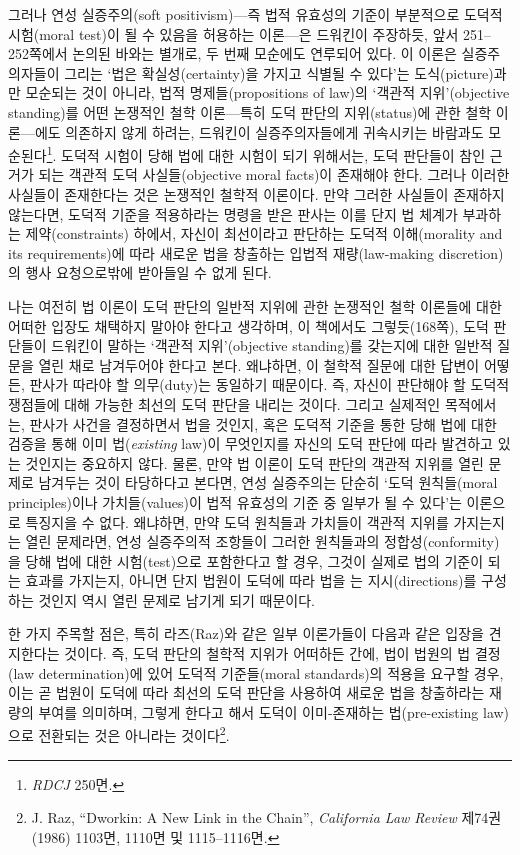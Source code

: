 그러나 연성 실증주의(soft positivism)---즉 법적 유효성의 기준이
부분적으로 도덕적 시험(moral test)이 될 수 있음을 허용하는 이론---은
드워킨이 주장하듯, 앞서 251--252쪽에서 논의된 바와는 별개로, 두 번째
모순에도 연루되어 있다. 이 이론은 실증주의자들이 그리는 `법은
확실성(certainty)을 가지고 식별될 수 있다'는 도식(picture)과만 모순되는
것이 아니라, 법적 명제들(propositions of law)의 `객관적 지위'(objective
standing)를 어떤 논쟁적인 철학 이론---특히 도덕 판단의 지위(status)에
관한 철학 이론---에도 의존하지 않게 하려는, 드워킨이 실증주의자들에게
귀속시키는 바람과도 모순된다\footnote{\emph{RDCJ} 250면.}. 도덕적 시험이
당해 법에 대한 시험이 되기 위해서는, 도덕 판단들이 참인 근거가 되는
객관적 도덕 사실들(objective moral facts)이 존재해야 한다. 그러나 이러한
사실들이 존재한다는 것은 논쟁적인 철학적 이론이다. 만약 그러한 사실들이
존재하지 않는다면, 도덕적 기준을 적용하라는 명령을 받은 판사는 이를 단지
법 체계가 부과하는 제약(constraints) 하에서, 자신이 최선이라고 판단하는
도덕적 이해(morality and its requirements)에 따라 새로운 법을 창출하는
입법적 재량(law-making discretion)의 행사 요청으로밖에 받아들일 수 없게
된다.

나는 여전히 법 이론이 도덕 판단의 일반적 지위에 관한 논쟁적인 철학
이론들에 대한 어떠한 입장도 채택하지 말아야 한다고 생각하며, 이 책에서도
그렇듯(168쪽), 도덕 판단들이 드워킨이 말하는 `객관적 지위'(objective
standing)를 갖는지에 대한 일반적 질문을 열린 채로 남겨두어야 한다고
본다. 왜냐하면, 이 철학적 질문에 대한 답변이 어떻든, 판사가 따라야 할
의무(duty)는 동일하기 때문이다. 즉, 자신이 판단해야 할 도덕적 쟁점들에
대해 가능한 최선의 도덕 판단을 내리는 것이다. 그리고 실제적인
목적에서는, 판사가 사건을 결정하면서 법을 
것인지, 혹은 도덕적 기준을 통한 당해 법에 대한 검증을 통해 이미
 법(\emph{existing} law)이 무엇인지를 자신의 도덕 판단에
따라 발견하고 있는 것인지는 중요하지 않다. 물론, 만약 법 이론이 도덕
판단의 객관적 지위를 열린 문제로 남겨두는 것이 타당하다고 본다면, 연성
실증주의는 단순히 `도덕 원칙들(moral principles)이나 가치들(values)이
법적 유효성의 기준 중 일부가 될 수 있다'는 이론으로 특징지을 수 없다.
왜냐하면, 만약 도덕 원칙들과 가치들이 객관적 지위를 가지는지는 열린
문제라면, 연성 실증주의적 조항들이 그러한 원칙들과의
정합성(conformity)을 당해 법에 대한 시험(test)으로 포함한다고 할 경우,
그것이 실제로 법의 기준이 되는 효과를 가지는지, 아니면 단지 법원이
도덕에 따라 법을 는 지시(directions)를 구성하는
것인지 역시 열린 문제로 남기게 되기 때문이다.

한 가지 주목할 점은, 특히 라즈(Raz)와 같은 일부 이론가들이 다음과 같은
입장을 견지한다는 것이다. 즉, 도덕 판단의 철학적 지위가 어떠하든 간에,
법이 법원의 법 결정(law determination)에 있어 도덕적 기준들(moral
standards)의 적용을 요구할 경우, 이는 곧 법원이 도덕에 따라 최선의 도덕
판단을 사용하여 새로운 법을 창출하라는 재량의 부여를 의미하며, 그렇게
한다고 해서 도덕이 이미-존재하는 법(pre-existing law)으로 전환되는 것은
아니라는 것이다\footnote{J. Raz, ``Dworkin: A New Link in the Chain'',
  \emph{California Law Review} 제74권 (1986) 1103면, 1110면 및
  1115--1116면.}.

